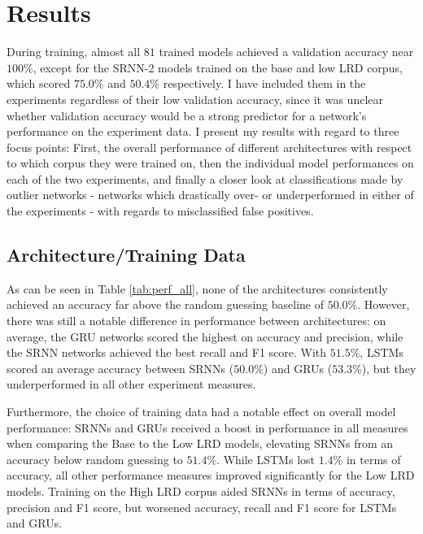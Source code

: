 \section{Results}\label{ch:results}
During training, almost all $81$ trained models achieved a validation accuracy near $100\%$, except for the SRNN-2 models trained on the base and low LRD corpus, which scored $75.0\%$ and $50.4\%$ respectively. I have included them in the experiments regardless of their low validation accuracy, since it was unclear whether validation accuracy would be a strong predictor for a network's performance on the experiment data. I present my results with regard to three focus points: First, the overall performance of different architectures with respect to which corpus they were trained on, then the individual model performances on each of the two experiments, and finally a closer look at classifications made by outlier networks - networks which drastically over- or underperformed in either of the experiments - with regards to misclassified false positives.

\subsection{Architecture/Training Data}

As can be seen in Table \ref{tab:perf_all}, none of the architectures consistently achieved an accuracy far above the random guessing baseline of $50.0\%$. However, there was still a notable difference in performance between architectures: on average, the GRU networks scored the highest on accuracy and precision, while the SRNN networks achieved the best recall and F1 score. With $51.5\%$, LSTMs scored an average accuracy between SRNNs ($50.0\%$) and GRUs ($53.3\%$), but they underperformed in all other experiment measures.

Furthermore, the choice of training data had a notable effect on overall model performance: SRNNs and GRUs received a boost in performance in all measures when comparing the Base to the Low LRD models, elevating SRNNs from an accuracy below random guessing to $51.4\%$. While LSTMs lost $1.4\%$ in terms of accuracy, all other performance measures improved significantly for the Low LRD models. Training on the High LRD corpus aided SRNNs in terms of accuracy, precision and F1 score, but worsened accuracy, recall and F1 score for LSTMs and GRUs.

